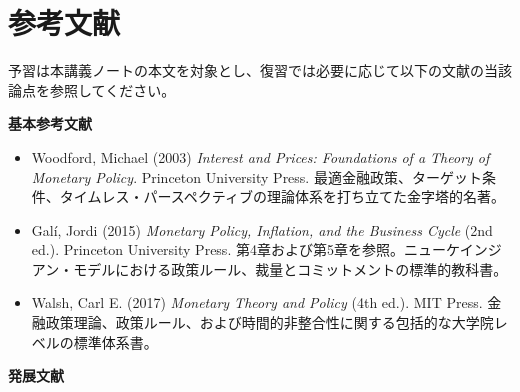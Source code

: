 \documentclass[
  japanese,
  lualatex,
  ja=standard,
  12pt,
  a4paper]{ltjsarticle}
\providecommand{\tightlist}{%
  \setlength{\itemsep}{0pt}\setlength{\parskip}{0pt}}
\begin{document}
\Needspace{0.25\textheight}

\section{参考文献}\label{ux53c2ux8003ux6587ux732e}

予習は本講義ノートの本文を対象とし、復習では必要に応じて以下の文献の当該論点を参照してください。

\textbf{基本参考文献}

\begin{itemize}
\tightlist
\item
  Woodford, Michael (2003) \emph{Interest and Prices: Foundations of a
  Theory of Monetary Policy}. Princeton University Press.
  最適金融政策、ターゲット条件、タイムレス・パースペクティブの理論体系を打ち立てた金字塔的名著。
\item
  Galí, Jordi (2015) \emph{Monetary Policy, Inflation, and the Business
  Cycle} (2nd ed.). Princeton University Press.
  第4章および第5章を参照。ニューケインジアン・モデルにおける政策ルール、裁量とコミットメントの標準的教科書。
\item
  Walsh, Carl E. (2017) \emph{Monetary Theory and Policy} (4th ed.). MIT
  Press.
  金融政策理論、政策ルール、および時間的非整合性に関する包括的な大学院レベルの標準体系書。
\end{itemize}

\textbf{発展文献}
\end{document}
